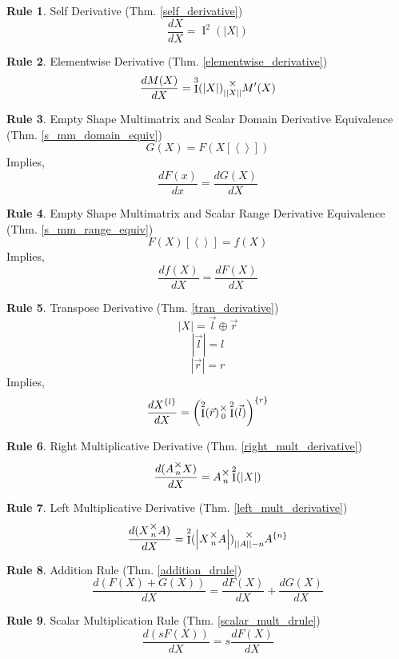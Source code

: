 \documentclass[12pt]{book}
\theoremstyle{plain}
\theoremstyle{definition}
\newtheorem{drule}{Rule}
\theoremstyle{ppart}
\theoremstyle{case}
\theoremstyle{solution}
\DeclareMathOperator{\Ident}{I}
\newcommand{\mmult}[1]{\text{\raisebox{1ex}{$\underset{#1}{\times}$}}}
\newcommand{\shape}[1]{\left|#1\right|}
\newcommand{\transpose}[2]{{#1}^{\{#2\}}}
\begin{document}
\begin{appendices}
\begin{drule}
Self Derivative (Thm. \ref{self_derivative})
\[ \frac{dX}{dX} = \Ident^2(\shape{X}) \]
\end{drule}

\begin{drule}
Elementwise Derivative (Thm. \ref{elementwise_derivative})
\[ \frac{dM(X)}{dX} = \Ident^3(\shape{X}) \mmult{\shape{\shape{X}}} M'(X) \]
\end{drule}

\begin{drule}
Empty Shape Multimatrix and Scalar Domain Derivative Equivalence
(Thm. \ref{s_mm_domain_equiv})
\[ G(X) = F(X[\left<\right>]) \]
Implies,
\[ \frac{dF(x)}{dx} = \frac{dG(X)}{dX} \]
\end{drule}

\begin{drule}
Empty Shape Multimatrix and Scalar Range Derivative Equivalence
(Thm. \ref{s_mm_range_equiv})
\[ F(X)[\left<\right>] = f(X) \]
Implies,
\[ \frac{df(X)}{dX} = \frac{dF(X)}{dX} \]
\end{drule}

\begin{drule}
Transpose Derivative
(Thm. \ref{tran_derivative})
\[ \shape{X} = \vec{l} \oplus \vec{r} \]
\[ \shape{\vec{l}} = l \]
\[ \shape{\vec{r}} = r \]
Implies,
\[
  \frac{d\transpose{X}{l}}{dX} =
  \transpose{\left(\Ident^2(\vec{r}) \mmult{0} \Ident^2(\vec{l})\right)}{r}
\]
\end{drule}

\begin{drule}
Right Multiplicative Derivative
(Thm. \ref{right_mult_derivative})
\[ \frac{d(A \mmult{n} X)}{dX} = A \mmult{n} \Ident^2(\shape{X}) \]
\end{drule}

\begin{drule}
Left Multiplicative Derivative
(Thm. \ref{left_mult_derivative})
\[ \frac{d(X \mmult{n} A)}{dX} = \Ident^2(\shape{X \mmult{n} A}) \mmult{\shape{\shape{A}}-n} \transpose{A}{n} \]
\end{drule}

\begin{drule}
Addition Rule
(Thm. \ref{addition_drule})
\[ \frac{d(F(X) + G(X))}{dX} = \frac{dF(X)}{dX} + \frac{dG(X)}{dX} \]
\end{drule}

\begin{drule}
Scalar Multiplication Rule
(Thm. \ref{scalar_mult_drule})
\[ \frac{d(sF(X))}{dX} = s\frac{dF(X)}{dX} \]
\end{drule}


\end{appendices}
\end{document}
